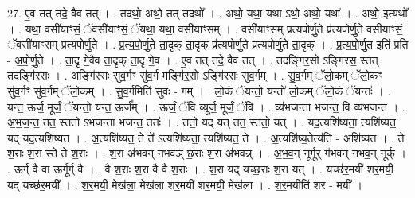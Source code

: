 \documentclass[17pt]{extarticle}
\begin{document}
27. ए॒व तत् तदे॒ वैव तत् । . तदथो॒ अथो॒ तत् तदथो᳚ । . अथो॒ यथा॒ यथा ऽथो॒ अथो॒ यथा᳚ । . अथो॒ इत्यथो᳚ । . यथा॒ वसी॑याꣳसं॒ ॅवसी॑याꣳसं॒ ॅयथा॒ यथा॒ वसी॑याꣳसम् । . वसी॑याꣳसम् प्रत्यपोर्णु॒ते प्र॑त्यपोर्णु॒ते वसी॑याꣳसं॒ ॅवसी॑याꣳसम् प्रत्यपोर्णु॒ते । . प्र॒त्य॒पो॒र्णु॒ते ता॒दृक् ता॒दृक् प्र॑त्यपोर्णु॒ते प्र॑त्यपोर्णु॒ते ता॒दृक् । . प्र॒त्य॒पो॒र्णु॒त इति॑ प्रति - अ॒पो॒र्णु॒ते । . ता॒दृ गे॒वैव ता॒दृक् ता॒दृ गे॒व । . ए॒व तत् तदे॒ वैव तत् । . तदङ्गि॑र॒सो ऽङ्गि॑रस॒ स्तत् तदङ्गि॑रसः । . अङ्गि॑रसः सुव॒र्गꣳ सु॑व॒र्ग मङ्गि॑र॒सो ऽङ्गि॑रसः सुव॒र्गम् । . सु॒व॒र्गम् ॅलो॒कम् ॅलो॒कꣳ सु॑व॒र्गꣳ सु॑व॒र्गम् ॅलो॒कम् । . सु॒व॒र्गमिति॑ सुवः - गम् । . लो॒कं ॅयन्तो॒ यन्तो॑ लो॒कम् ॅलो॒कं ॅयन्तः॑ । . यन्त॒ ऊर्ज॒ मूर्जं॒ ॅयन्तो॒ यन्त॒ ऊर्ज᳚म् । . ऊर्जं॒ ॅवि व्यूर्ज॒ मूर्जं॒ ॅवि । . व्य॑भजन्ता भजन्त॒ वि व्य॑भजन्त । . अ॒भ॒ज॒न्त॒ तत॒ स्ततो॑ ऽभजन्ता भजन्त॒ ततः॑ । . ततो॒ यद् यत् तत॒ स्ततो॒ यत् । . यद॒त्यशि॑ष्यता॒ त्यशि॑ष्यत॒ यद् यद॒त्यशि॑ष्यत । . अ॒त्यशि॑ष्यत॒ ते ते᳚ ऽत्यशि॑ष्यता॒ त्यशि॑ष्यत॒ ते । . अ॒त्यशि॑ष्य॒तेत्य॑ति - अशि॑ष्यत । . ते श॒राः श॒रा स्ते ते श॒राः । . श॒रा अ॑भवन् नभवञ् छ॒राः श॒रा अ॑भवन्न् । . अ॒भ॒व॒न् नूर्गूर् ग॑भवन् नभव॒न् नूर्क् । . ऊर्ग् वै वा ऊर्गूर्ग् वै । . वै श॒राः श॒रा वै वै श॒राः । . श॒रा यद् यच्छ॒राः श॒रा यत् । . यच्छ॑र॒मयी॑ शर॒मयी॒ यद् यच्छ॑र॒मयी᳚ । . श॒र॒मयी॒ मेख॑ला॒ मेख॑ला शर॒मयी॑ शर॒मयी॒ मेख॑ला । . श॒र॒मयीति॑ शर - मयी᳚ । \newline
\end{document}
